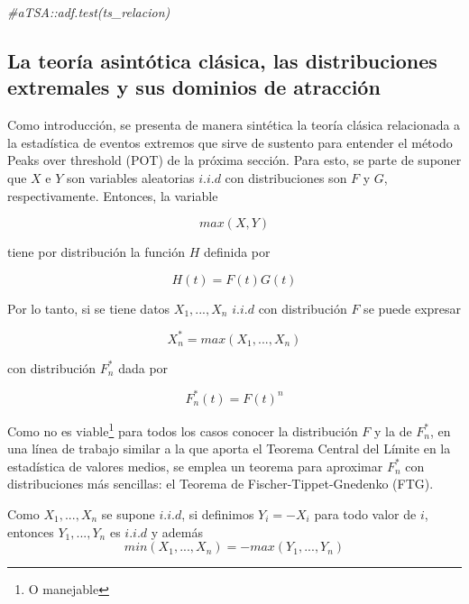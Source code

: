 \documentclass[
  12pt]{article}
\newenvironment{Shaded}{\begin{snugshade}}{\end{snugshade}}
\newcommand{\CommentTok}[1]{\textcolor[rgb]{0.56,0.35,0.01}{\textit{#1}}}
\begin{document}
\begin{Shaded}
\begin{Highlighting}[]
\CommentTok{\#aTSA::adf.test(ts\_relacion)}
\end{Highlighting}
\end{Shaded}

\newpage

\subsection{La teoría asintótica clásica, las distribuciones extremales
y sus dominios de
atracción}\label{la-teoruxeda-asintuxf3tica-cluxe1sica-las-distribuciones-extremales-y-sus-dominios-de-atracciuxf3n}

Como introducción, se presenta de manera sintética la teoría clásica
relacionada a la estadística de eventos extremos que sirve de sustento
para entender el método Peaks over threshold (POT) de la próxima
sección. Para esto, se parte de suponer que \(X\) e \(Y\) son variables
aleatorias \(i.i.d\) con distribuciones son \(F\) y \(G\),
respectivamente. Entonces, la variable

\begin{equation}
max(X,Y)
\end{equation}

tiene por distribución la función \(H\) definida por

\begin{equation}
H(t)= F(t) G(t)
\end{equation}

Por lo tanto, si se tiene datos \(X_1,...,X_n\) \(i.i.d\) con
distribución \(F\) se puede expresar

\begin{equation}
X_n^* = max (X_1,...,X_n)
\end{equation}

con distribución \(F_n^*\) dada por

\begin{equation}
F_n^* (t)= F(t)^n
\end{equation}

Como no es viable\footnote{O manejable} para todos los casos conocer la
distribución \(F\) y la de \(F_n^*\), en una línea de trabajo similar a
la que aporta el Teorema Central del Límite en la estadística de valores
medios, se emplea un teorema para aproximar \(F_n^{*}\) con
distribuciones más sencillas: el Teorema de Fischer-Tippet-Gnedenko
(FTG).

\begin{mydefinition}
Como $X_1,...,X_n$ se supone $i.i.d$, si definimos 
$Y_i = -X_i$ para todo valor de $i$, entonces $Y_1,...,Y_n$ es $i.i.d$ y
además
\begin{equation}
min(X_1,...,X_n) = - max(Y_1,...,Y_n)
\end{equation}
\end{mydefinition}
\end{document}
